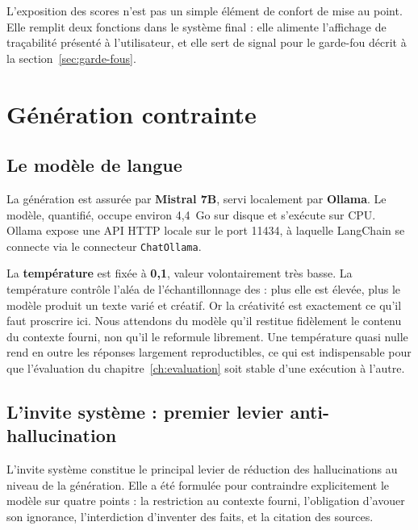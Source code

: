 L'exposition des scores n'est pas un simple élément de confort de mise au point.
Elle remplit deux fonctions dans le système final : elle alimente
l'affichage de traçabilité présenté à l'utilisateur, et elle sert de signal pour
le garde-fou décrit à la section~\ref{sec:garde-fous}.

\section{Génération contrainte}

\subsection{Le modèle de langue}

La génération est assurée par \textbf{Mistral 7B}, servi localement par
\textbf{Ollama}. Le modèle, quantifié, occupe environ 4,4~Go sur disque et
s'exécute sur CPU. Ollama expose une API HTTP locale sur le port 11434, à
laquelle LangChain se connecte via le connecteur \texttt{ChatOllama}.

La \textbf{température} est fixée à \textbf{0,1}, valeur volontairement très
basse. La température contrôle l'aléa de l'échantillonnage des  :
plus elle est élevée, plus le modèle produit un texte varié et créatif. Or la
créativité est exactement ce qu'il faut proscrire ici. Nous attendons du modèle
qu'il restitue fidèlement le contenu du contexte fourni, non qu'il le reformule
librement. Une température quasi nulle rend en outre les réponses largement
reproductibles, ce qui est indispensable pour que l'évaluation du
chapitre~\ref{ch:evaluation} soit stable d'une exécution à l'autre.

\subsection{L'invite système : premier levier anti-hallucination}

L'invite système constitue le principal levier de réduction des hallucinations
au niveau de la génération. Elle a été formulée pour contraindre explicitement
le modèle sur quatre points : la restriction au contexte fourni, l'obligation
d'avouer son ignorance, l'interdiction d'inventer des faits, et la citation des
sources.

